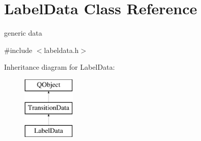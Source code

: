 \hypertarget{class_label_data}{}\section{Label\+Data Class Reference}
\label{class_label_data}


generic data  




{\ttfamily \#include $<$labeldata.\+h$>$}

Inheritance diagram for Label\+Data\+:\begin{figure}[H]
\begin{center}
\leavevmode
\includegraphics[height=3.000000cm]{class_label_data}
\end{center}
\end{figure}
